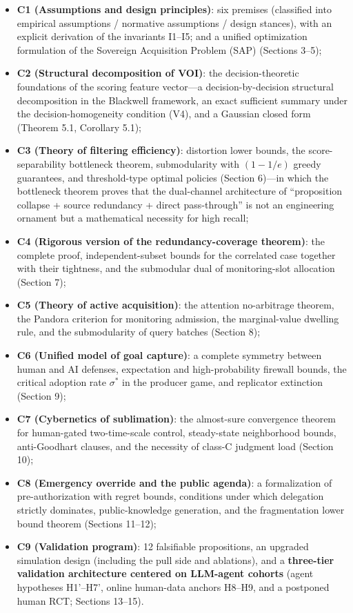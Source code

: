\documentclass[
  11pt]{article}
\providecommand{\tightlist}{%
  \setlength{\itemsep}{0pt}\setlength{\parskip}{0pt}}
\begin{document}
\begin{itemize}
\tightlist
\item
  \textbf{C1 (Assumptions and design principles)}: six premises
  (classified into empirical assumptions / normative assumptions /
  design stances), with an explicit derivation of the invariants I1--I5;
  and a unified optimization formulation of the Sovereign Acquisition
  Problem (SAP) (Sections 3--5);
\item
  \textbf{C2 (Structural decomposition of VOI)}: the decision-theoretic
  foundations of the scoring feature vector---a decision-by-decision
  structural decomposition in the Blackwell framework, an exact
  sufficient summary under the decision-homogeneity condition (V4), and
  a Gaussian closed form (Theorem 5.1, Corollary 5.1);
\item
  \textbf{C3 (Theory of filtering efficiency)}: distortion lower bounds,
  the score-separability bottleneck theorem, submodularity with
  \((1-1/e)\) greedy guarantees, and threshold-type optimal policies
  (Section 6)---in which the bottleneck theorem proves that the
  dual-channel architecture of ``proposition collapse + source
  redundancy + direct pass-through'' is not an engineering ornament but
  a mathematical necessity for high recall;
\item
  \textbf{C4 (Rigorous version of the redundancy-coverage theorem)}: the
  complete proof, independent-subset bounds for the correlated case
  together with their tightness, and the submodular dual of
  monitoring-slot allocation (Section 7);
\item
  \textbf{C5 (Theory of active acquisition)}: the attention no-arbitrage
  theorem, the Pandora criterion for monitoring admission, the
  marginal-value dwelling rule, and the submodularity of query batches
  (Section 8);
\item
  \textbf{C6 (Unified model of goal capture)}: a complete symmetry
  between human and AI defenses, expectation and high-probability
  firewall bounds, the critical adoption rate \(\sigma^*\) in the
  producer game, and replicator extinction (Section 9);
\item
  \textbf{C7 (Cybernetics of sublimation)}: the almost-sure convergence
  theorem for human-gated two-time-scale control, steady-state
  neighborhood bounds, anti-Goodhart clauses, and the necessity of
  class-C judgment load (Section 10);
\item
  \textbf{C8 (Emergency override and the public agenda)}: a
  formalization of pre-authorization with regret bounds, conditions
  under which delegation strictly dominates, public-knowledge
  generation, and the fragmentation lower bound theorem (Sections
  11--12);
\item
  \textbf{C9 (Validation program)}: 12 falsifiable propositions, an
  upgraded simulation design (including the pull side and ablations),
  and a \textbf{three-tier validation architecture centered on LLM-agent
  cohorts} (agent hypotheses H1'--H7', online human-data anchors H8--H9,
  and a postponed human RCT; Sections 13--15).
\end{itemize}
\end{document}
